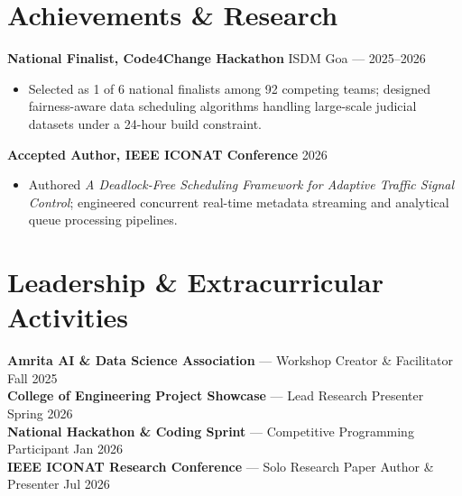 \documentclass[a4paper,10pt]{article}
\begin{document}
\vspace{2pt}


\section*{Achievements \& Research}

\textbf{National Finalist, Code4Change Hackathon} \hfill ISDM Goa --- 2025--2026
\begin{itemize}[leftmargin=*,noitemsep,topsep=1pt,parsep=0pt,partopsep=0pt,itemsep=1pt]
\item Selected as 1 of 6 national finalists among 92 competing teams; designed fairness-aware data scheduling algorithms handling large-scale judicial datasets under a 24-hour build constraint.
\end{itemize}

\textbf{Accepted Author, IEEE ICONAT Conference} \hfill 2026
\begin{itemize}[leftmargin=*,noitemsep,topsep=1pt,parsep=0pt,partopsep=0pt,itemsep=1pt]
\item Authored \textit{A Deadlock-Free Scheduling Framework for Adaptive Traffic Signal Control}; engineered concurrent real-time metadata streaming and analytical queue processing pipelines.
\end{itemize}


\section*{Leadership \& Extracurricular Activities}

\textbf{Amrita AI \& Data Science Association} --- Workshop Creator \& Facilitator \hfill Fall 2025\\
\textbf{College of Engineering Project Showcase} --- Lead Research Presenter \hfill Spring 2026\\
\textbf{National Hackathon \& Coding Sprint} --- Competitive Programming Participant \hfill Jan 2026\\
\textbf{IEEE ICONAT Research Conference} --- Solo Research Paper Author \& Presenter \hfill Jul 2026
\end{document}
